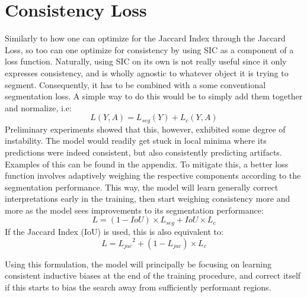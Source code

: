 \section{Consistency Loss}
Similarly to how one can optimize for the Jaccard Index through the Jaccard Loss, so too can one optimize for consistency by using SIC as a component of a loss function. Naturally, using SIC on its own is not really useful since it only expresses consistency, and is wholly agnostic to whatever object it is trying to segment. Consequently, it has to be combined with a some conventional segmentation loss. A simple way to do this would be to simply add them together and normalize, i.e:
\begin{equation*}
    L(Y, A) = L_{seg}(Y)+L_c(Y,A)
\end{equation*}
Preliminary experiments showed that this, however, exhibited some degree of instability. The model would readily get stuck in local minima where its predictions were indeed consistent, but also consistently predicting artifacts. Examples of this can be found in the appendix. To mitigate this, a better loss function involves adaptively weighing the respective components according to the segmentation performance. This way, the model will learn generally correct interpretations early in the training, then start weighing consistency more and more as the model sees improvements to its segmentation performance:
    \begin{equation}
        L = (1-IoU)\times L_{seg} + IoU \times L_c
    \end{equation}
        If the Jaccard Index (IoU) is used, this is also equivalent to:
    \begin{equation}
        L = {L_{jac}}^2 + (1-L_{jac})\times L_c
    \end{equation}

Using this formulation, the model will principally be focusing on learning consistent inductive biases at the end of the training procedure, and correct itself if this starts to bias the search away from sufficiently performant regions.
